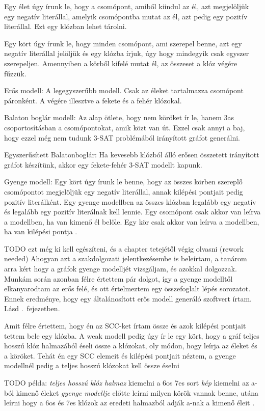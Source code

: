 \documentclass[
]{thesis-ekf}
\theoremstyle{definition}
\theoremstyle{remark}
\begin{document}
	Egy élet úgy írunk le, hogy a csomópont, amiből kiindul az él, azt megjelöljük egy negatív literállal, amelyik csomópontba mutat az él, azt pedig egy pozitív literállal. Ezt egy klózban lehet tárolni.
	
	Egy kört úgy írunk le, hogy minden csomópont, ami szerepel benne, azt egy negatív literállal jelöljük és egy klózba írjuk, úgy hogy mindegyik csak egyszer szerepeljen. Amennyiben a körből kifelé mutat él, az összeset a klóz végére fűzzük.
	
	Erős modell: A legegyszerűbb modell. Csak az éleket tartalmazza csomópont páronként. A végére illesztve a fekete és a fehér klózokal.
		
	Balaton boglár modell: Az alap ötlete, hogy nem köröket ír le, hanem 3as csoportosításban a csomópontokat, amik közt van út. Ezzel csak annyi a baj, hogy ezzel még nem tudunk 3-SAT problémából irányított gráfot generálni.
	
	Egyszerűsített Balatonboglár: Ha kevesebb klózból álló erősen összetett irányított gráfot készítünk, akkor egy fekete-fehér 3-SAT modellt kapunk.

	Gyenge modell: Egy kört úgy írunk le benne, hogy az összes körben szereplő csomópontot megjelöljük egy negatív literállal, annak kilépési pontjait pedig pozitív literálként. Egy gyenge modellben az összes klózban legalább egy negatív és legalább egy pozitív literálnak kell lennie. Egy csomópont csak akkor van leírva a modellben, ha van kimenő él belőle. Egy kör csak akkor van leírva a modellben, ha van kilépési pontja \cite{sat-solving-50}.
	
	TODO ezt még ki kell egészíteni, és a chapter tetejétől végig olvasni (rework needed)
	Ahogyan azt a szakdolgozati jelentkezésembe is beleírtam, a tanárom arra kért hogy a gráfok gyenge modelljét vizsgáljam, és azokkal dolgozzak. Munkám során azonban félre értettem pár dolgot, így a gyenge modelltől elkanyarodtam az erős felé, és ott értelmeztem egy összefoglalt lépés sorozatot. Ennek eredménye, hogy egy általánosított erős modell generáló szoftvert írtam. Lásd .~fejezetben.
	
	Amit félre értettem, hogy én az SCC-ket írtam össze és azok kilépési pontjait tettem bele egy klózba. A weak modell pedig úgy ír le egy kört, hogy a gráf teljes hosszú klóz halmazából éseli össze a klózokat, oly módon, hogy leírja az éleket és a köröket. Tehát én egy SCC elemeit és kilépési pontjait néztem, a gyenge modellnél pedig a teljes hosszú klózokat kell össze éselni 

	TODO példa: \textit{teljes hosszú klóz halmaz} kiemelni a 6os 7es sort \textit{kép} kiemelni az a-ból kimenő éleket \textit{gyenge modellje} előtte leírni milyen körök vannak benne, utána leírni hogy a 6os és 7es klózok az eredeti halmazból adják a-nak a kimenő éleit \cite[a 24.~oldalon]{sat-solving-50}.
\end{document}
